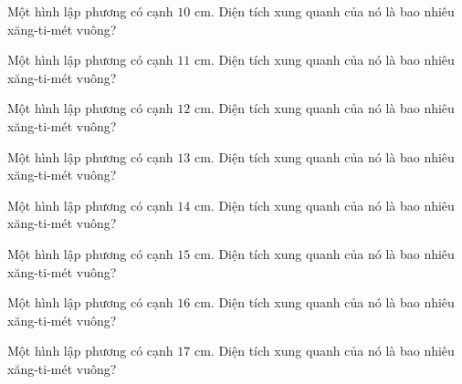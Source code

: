 \begin{ex}
  Một hình lập phương có cạnh $10\text{ cm}$. Diện tích xung quanh của nó là bao nhiêu xăng-ti-mét vuông?
\end{ex}

\begin{ex}
  Một hình lập phương có cạnh $11\text{ cm}$. Diện tích xung quanh của nó là bao nhiêu xăng-ti-mét vuông?
\end{ex}

\begin{ex}
  Một hình lập phương có cạnh $12\text{ cm}$. Diện tích xung quanh của nó là bao nhiêu xăng-ti-mét vuông?
\end{ex}

\begin{ex}
  Một hình lập phương có cạnh $13\text{ cm}$. Diện tích xung quanh của nó là bao nhiêu xăng-ti-mét vuông?
\end{ex}

\begin{ex}
  Một hình lập phương có cạnh $14\text{ cm}$. Diện tích xung quanh của nó là bao nhiêu xăng-ti-mét vuông?
\end{ex}

\begin{ex}
  Một hình lập phương có cạnh $15\text{ cm}$. Diện tích xung quanh của nó là bao nhiêu xăng-ti-mét vuông?
\end{ex}

\begin{ex}
  Một hình lập phương có cạnh $16\text{ cm}$. Diện tích xung quanh của nó là bao nhiêu xăng-ti-mét vuông?
\end{ex}

\begin{ex}
  Một hình lập phương có cạnh $17\text{ cm}$. Diện tích xung quanh của nó là bao nhiêu xăng-ti-mét vuông?
\end{ex}


